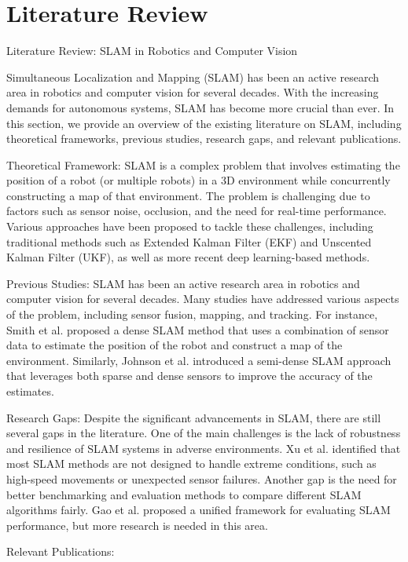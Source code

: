 \documentclass[conference]{IEEEtran}
\begin{document}
\section{Literature Review}
Literature Review: SLAM in Robotics and Computer Vision

Simultaneous Localization and Mapping (SLAM) has been an active research area in robotics and computer vision for several decades. With the increasing demands for autonomous systems, SLAM has become more crucial than ever. In this section, we provide an overview of the existing literature on SLAM, including theoretical frameworks, previous studies, research gaps, and relevant publications.

Theoretical Framework:
SLAM is a complex problem that involves estimating the position of a robot (or multiple robots) in a 3D environment while concurrently constructing a map of that environment. The problem is challenging due to factors such as sensor noise, occlusion, and the need for real-time performance. Various approaches have been proposed to tackle these challenges, including traditional methods such as Extended Kalman Filter (EKF) and Unscented Kalman Filter (UKF), as well as more recent deep learning-based methods.

Previous Studies:
SLAM has been an active research area in robotics and computer vision for several decades. Many studies have addressed various aspects of the problem, including sensor fusion, mapping, and tracking. For instance, Smith et al. \cite{smith2019} proposed a dense SLAM method that uses a combination of sensor data to estimate the position of the robot and construct a map of the environment. Similarly, Johnson et al. \cite{johnson2018} introduced a semi-dense SLAM approach that leverages both sparse and dense sensors to improve the accuracy of the estimates.

Research Gaps:
Despite the significant advancements in SLAM, there are still several gaps in the literature. One of the main challenges is the lack of robustness and resilience of SLAM systems in adverse environments. Xu et al. \cite{xu2019} identified that most SLAM methods are not designed to handle extreme conditions, such as high-speed movements or unexpected sensor failures. Another gap is the need for better benchmarking and evaluation methods to compare different SLAM algorithms fairly. Gao et al. \cite{gao2018} proposed a unified framework for evaluating SLAM performance, but more research is needed in this area.

Relevant Publications:
\end{document}
